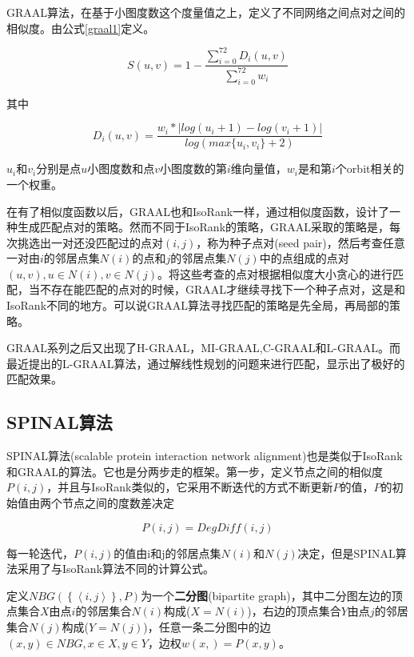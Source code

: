 GRAAL算法，在基于小图度数这个度量值之上，定义了不同网络之间点对之间的相似度。由公式\ref{graal1}定义。

\begin{equation}\label{graal1}
S(u,v)=1-\frac{\sum_{i=0}^{72}D_i(u,v)}{\sum_{i=0}^{72}w_i}
\end{equation}

其中

\begin{equation}\label{graal2}
D_i(u,v)=\frac{w_i*\left | log(u_i+1)-log(v_i+1) \right |}{log(max\{u_i,v_i\}+2)}
\end{equation}

$u_i$和$v_i$分别是点$u$小图度数和点$v$小图度数的第$i$维向量值，$w_i$是和第$i$个orbit相关的一个权重。

在有了相似度函数以后，GRAAL也和IsoRank一样，通过相似度函数，设计了一种生成匹配点对的策略。然而不同于IsoRank的策略，GRAAL采取的策略是，每次挑选出一对还没匹配过的点对$(i,j)$，称为种子点对(seed pair)，然后考查任意一对由$i$的邻居点集$N(i)$的点和$j$的邻居点集$N(j)$中的点组成的点对$(u,v),u\in N(i),v\in N(j)$。将这些考查的点对根据相似度大小贪心的进行匹配，当不存在能匹配的点对的时候，GRAAL才继续寻找下一个种子点对，这是和IsoRank不同的地方。可以说GRAAL算法寻找匹配的策略是先全局，再局部的策略。

GRAAL系列之后又出现了H-GRAAL\cite{milenkovic2010optimal}，MI-GRAAL\cite{kuchaiev2011integrative},C-GRAAL\cite{memivsevic2012c}和L-GRAAL\cite{malod2015graal}。而最近提出的L-GRAAL\cite{malod2015graal}算法，通过解线性规划的问题来进行匹配，显示出了极好的匹配效果。

\subsection{SPINAL算法}
SPINAL算法(scalable protein interaction network alignment)也是类似于IsoRank和GRAAL的算法。它也是分两步走的框架。第一步，定义节点之间的相似度$P(i,j)$，并且与IsoRank类似的，它采用不断迭代的方式不断更新$P$的值，$P$的初始值由两个节点之间的度数差决定

\begin{equation}\label{spinal1}
P(i,j)=DegDiff(i,j)
\end{equation}

每一轮迭代，$P(i,j)$的值由i和j的邻居点集$N(i)$和$N(j)$决定，但是SPINAL算法采用了与IsoRank算法不同的计算公式。

定义$NBG(\left \{ \left \langle i,j \right \rangle \right \},P)$为一个\textbf{二分图}(bipartite graph)，其中二分图左边的顶点集合$X$由点$i$的邻居集合$N(i)$构成($X=N(i)$)，右边的顶点集合$Y$由点$j$的邻居集合$N(j)$构成($Y=N(j)$)，任意一条二分图中的边$(x,y)\in NBG,x\in X,y\in Y$，边权$w(x,)=P(x,y)$。

